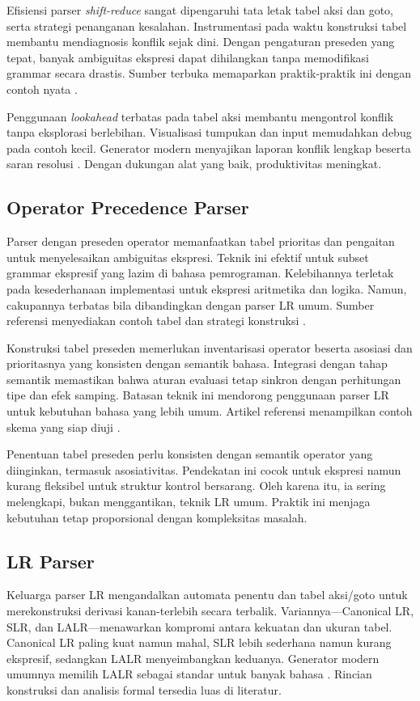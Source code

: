 \documentclass[../main.tex]{subfiles}
\begin{document}
Efisiensi parser \emph{shift-reduce} sangat dipengaruhi tata letak tabel aksi dan goto, serta strategi penanganan kesalahan. Instrumentasi pada waktu konstruksi tabel membantu mendiagnosis konflik sejak dini. Dengan pengaturan preseden yang tepat, banyak ambiguitas ekspresi dapat dihilangkan tanpa memodifikasi grammar secara drastis. Sumber terbuka memaparkan praktik-praktik ini dengan contoh nyata \citep{BisonManual}.

Penggunaan \emph{lookahead} terbatas pada tabel aksi membantu mengontrol konflik tanpa eksplorasi berlebihan. Visualisasi tumpukan dan input memudahkan debug pada contoh kecil. Generator modern menyajikan laporan konflik lengkap beserta saran resolusi \citep{BisonManual}. Dengan dukungan alat yang baik, produktivitas meningkat.

\subsection{Operator Precedence Parser}
Parser dengan preseden operator memanfaatkan tabel prioritas dan pengaitan untuk menyelesaikan ambiguitas ekspresi. Teknik ini efektif untuk subset grammar ekspresif yang lazim di bahasa pemrograman. Kelebihannya terletak pada kesederhanaan implementasi untuk ekspresi aritmetika dan logika. Namun, cakupannya terbatas bila dibandingkan dengan parser LR umum. Sumber referensi menyediakan contoh tabel dan strategi konstruksi \citep{WikiOperatorPrecedence}.

Konstruksi tabel preseden memerlukan inventarisasi operator beserta asosiasi dan prioritasnya yang konsisten dengan semantik bahasa. Integrasi dengan tahap semantik memastikan bahwa aturan evaluasi tetap sinkron dengan perhitungan tipe dan efek samping. Batasan teknik ini mendorong penggunaan parser LR untuk kebutuhan bahasa yang lebih umum. Artikel referensi menampilkan contoh skema yang siap diuji \citep{WikiOperatorPrecedence}.

Penentuan tabel preseden perlu konsisten dengan semantik operator yang diinginkan, termasuk asosiativitas. Pendekatan ini cocok untuk ekspresi namun kurang fleksibel untuk struktur kontrol bersarang. Oleh karena itu, ia sering melengkapi, bukan menggantikan, teknik LR umum. Praktik ini menjaga kebutuhan tetap proporsional dengan kompleksitas masalah.

\subsection{LR Parser}
Keluarga parser LR mengandalkan automata penentu dan tabel aksi/goto untuk merekonstruksi derivasi kanan-terlebih secara terbalik. Variannya—Canonical LR, SLR, dan LALR—menawarkan kompromi antara kekuatan dan ukuran tabel. Canonical LR paling kuat namun mahal, SLR lebih sederhana namun kurang ekspresif, sedangkan LALR menyeimbangkan keduanya. Generator modern umumnya memilih LALR sebagai standar untuk banyak bahasa \citep{WikiLR}. Rincian konstruksi dan analisis formal tersedia luas di literatur.
\end{document}
